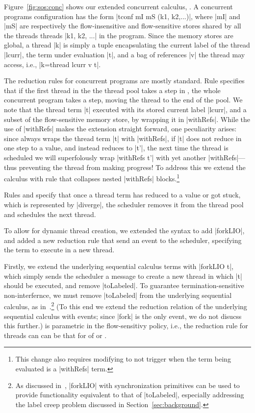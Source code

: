 Figure~\ref{fig:sos:conc} shows our extended concurrent calculus, \lioconc{}.
%
A concurrent programs configuration has the form |tconf mI mS (k1, k2,...)|,
where |mI| and |mS| are respectively the flow-insensitive and flow-sensitive
stores shared by all the threads threads |k1, k2, ...| in the program.
%
Since the memory stores are global, a thread |k| is simply a tuple
encapsulating the current label of the thread |lcurr|, the term under
evaluation |t|, and a bag of references |v| the thread may access, i.e.,
|k=thread lcurr v t|.

The reduction rules for concurrent programs are mostly standard.
%
Rule  specifies that if the first thread in the the thread pool
takes a step in \lioafs{}, the whole concurrent program takes a step, moving
the thread to the end of the pool.
%
We note that the thread term |t| executed with its stored current label
|lcurr|, and a subset of the flow-sensitive memory store, by wrapping it in
|withRefs|.
%
While the use of |withRefs| makes the extension straight forward, one
peculiarity arises: since  always wraps the thread term |t|
with |withRefs|, if |t| does not reduce in one step to a value, and instead
reduces to |t'|, the next time the thread is scheduled we will superfolously
wrap |withRefs t'| with yet another |withRefs|---thus preventing the thread
from making progress!
%
To address this we extend the calculus with rule  that
collapses nested |withRefs| blocks.\footnote{
This change also requires modifying  to not trigger when
the term being evaluated is a |withRefs| term.
}
 
Rules  and  specify that once a thread term
has reduced to a value or got stuck, which is represented by |diverge|, the
scheduler removes it from the thread pool and schedules the next thread.

%
To allow for dynamic thread creation, we extended the \lioafs{} syntax to add
|forkLIO|, and added a new reduction rule that send an event to the scheduler, specifying the term to execute in a new thread.
%


%
Firstly, we extend the underlying sequential calculus terms with |forkLIO t|,
which simply sends the scheduler a message to create a new thread in which |t|
should be executed, and remove |toLabeled|.
%
To guarantee termination-sensitive non-interfernce, we must remove |toLabeled|
from the underlying sequential calculus, as in~.\footnote{
As discussed in~, |forkLIO| with synchronization primitives can be
used to provide functionality equivalent to that of |toLabeled|, especially
addressing the label creep problem discussed in Section~\ref{sec:background}.
}
%
(To this end we extend the reduction relation of the underlying sequential
calculus with events; since |fork| is the only event, we do not disucss this
further.)
%
\lioconc{} is parametric in the flow-sensitivy policy, i.e., the reduction rule
for threads can can be that  for of \liofs{} or \lioafs{}.
 


